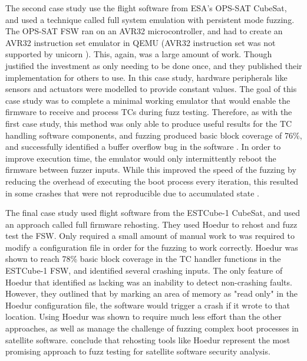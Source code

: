 \documentclass[../report.tex]{subfiles}
\begin{document}
The second case study use the flight software from ESA's OPS-SAT CubeSat, and
used a technique \citet{Willbold_2024} called full system emulation with
persistent mode fuzzing. The OPS-SAT FSW ran on an AVR32 microcontroller, and
\citet{Willbold_2024} had to create an AVR32 instruction set emulator in QEMU
(AVR32 instruction set was not supported by unicorn \citep{Unicorn}). This,
again, was a large amount of work. Though \citet{Willbold_2024} justified the
investment as only needing to be done once, and they published their
implementation for others to use. In this case study, hardware peripherals like
sensors and actuators were modelled to provide constant values. The goal of
this case study was to complete a minimal working emulator that would enable
the firmware to receive and process TCs during fuzz testing. Therefore, as with
the first case study, this method was only able to produce useful results for
the TC handling software components, and fuzzing produced basic block coverage
of 76\%, and successfully identified a buffer overflow bug in the software
\citep{Willbold_2024}. In order to improve execution time, the emulator would
only intermittently reboot the firmware between fuzzer inputs. While this
improved the speed of the fuzzing by reducing the overhead of executing the
boot process every iteration, this resulted in some crashes that were not
reproducible due to accumulated state \citep{Willbold_2024}.

The final case study used flight software from the ESTCube-1 CubeSat, and used
an approach \citet{Willbold_2024} called full firmware rehosting. They used
Hoedur \citep{Hoedur_2023} to rehost and fuzz test the FSW. Only required
a small amount of manual work to was required to modify a configuration file in
order for the fuzzing to work correctly. Hoedur was shown to reach 78\% basic
block coverage in the TC handler functions in the ESTCube-1 FSW, and identified
several crashing inputs. The only feature of Hoedur that \citet{Willbold_2024}
identified as lacking was an inability to detect non-crashing faults. However,
they outlined that by marking an area of memory as "read only" in the Hoedur
configuration file, the software would trigger a crash if it wrote to that
location. Using Hoedur was shown to require much less effort than the other
approaches, as well as manage the challenge of fuzzing complex boot processes
in satellite software. \citet{Willbold_2024} conclude that rehosting tools
like Hoedur represent the most promising approach to fuzz testing for satellite
software security analysis.





%
\end{document}
